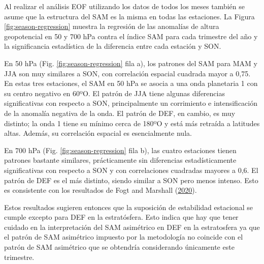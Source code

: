 \documentclass[12pt,oneside,a4paper]{reedthesis}
\begin{document}
Al realizar el análisis EOF utilizando los datos de todos los meses también se asume que la estructura del SAM es la misma en todas las estaciones.
La Figura \ref{fig:season-regression} muestra la regresión de las anomalías de altura geopotencial en 50 y 700 hPa contra el índice SAM para cada trimestre del año y la significancia estadística de la diferencia entre cada estación y SON.

En 50 hPa (Fig. \ref{fig:season-regression} fila a), los patrones del SAM para MAM y JJA son muy similares a SON, con correlación espacial cuadrada mayor a 0,75.
En estas tres estaciones, el SAM en 50 hPa se asocia a una onda planetaria 1 con su centro negativo en 60ºO.
El patrón de JJA tiene algunas diferencias significativas con respecto a SON, principalmente un corrimiento e intensificación de la anomalía negativa de la onda.
El patrón de DEF, en cambio, es muy distinto; la onda 1 tiene su mínimo cerca de 180ºO y está más retraída a latitudes altas.
Además, su correlación espacial es esencialmente nula.

En 700 hPa (Fig. \ref{fig:season-regression} fila b), las cuatro estaciones tienen patrones bastante similares, prácticamente sin diferencias estadísticamente significativas con respecto a SON y con correlaciones cuadradas mayores a 0,6.
El patrón de DEF es el más distinto, siendo similar a SON pero menos intenso.
Esto es consistente con los resultados de Fogt and Marshall (\protect\hyperlink{ref-fogt2020}{2020}).

Estos resultados sugieren entonces que la suposición de estabilidad estacional se cumple excepto para DEF en la estratósfera.
Esto indica que hay que tener cuidado en la interpretación del SAM asimétrico en DEF en la estratosfera ya que el patrón de SAM asimétrico impuesto por la metodología no coincide con el patrón de SAM asimétrico que se obtendría considerando únicamente este trimestre.
\end{document}
